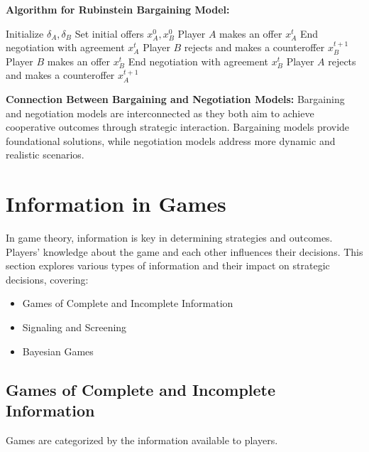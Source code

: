 \documentclass[12pt]{book} %
\begin{document}
\textbf{Algorithm for Rubinstein Bargaining Model:}
\FloatBarrier
\begin{algorithm}
\caption{Rubinstein Bargaining Model}
\begin{algorithmic}
\State Initialize $\delta_A, \delta_B$
\State Set initial offers $x_A^0, x_B^0$
        \State Player $A$ makes an offer $x_A^t$
            \State End negotiation with agreement $x_A^t$
        \Else
            \State Player $B$ rejects and makes a counteroffer $x_B^{t+1}$
        \EndIf
    \Else
        \State Player $B$ makes an offer $x_B^t$
            \State End negotiation with agreement $x_B^t$
        \Else
            \State Player $A$ rejects and makes a counteroffer $x_A^{t+1}$
        \EndIf
    \EndIf
\EndFor
\end{algorithmic}
\end{algorithm}
\FloatBarrier

\textbf{Connection Between Bargaining and Negotiation Models:}
Bargaining and negotiation models are interconnected as they both aim to achieve cooperative outcomes through strategic interaction. Bargaining models provide foundational solutions, while negotiation models address more dynamic and realistic scenarios.


\section{Information in Games}

In game theory, information is key in determining strategies and outcomes. Players' knowledge about the game and each other influences their decisions. This section explores various types of information and their impact on strategic decisions, covering:

\begin{itemize}
    \item Games of Complete and Incomplete Information
    \item Signaling and Screening
    \item Bayesian Games
\end{itemize}

\subsection{Games of Complete and Incomplete Information}

Games are categorized by the information available to players. 
\end{document}
